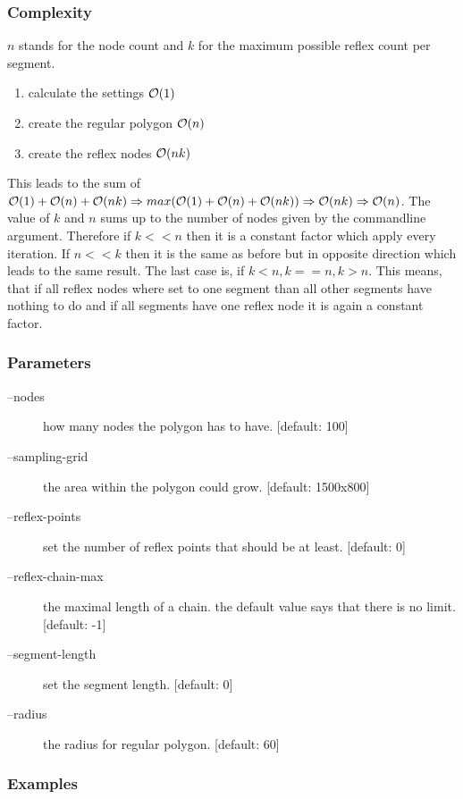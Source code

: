 \subsubsection{Complexity}
$n$ stands for the node count and $k$ for the maximum possible reflex count per segment.
\begin{enumerate}
  \item calculate the settings $\mathcal{O}(1)$
  \item create the regular polygon $\mathcal{O}(n)$
  \item create the reflex nodes $\mathcal{O}(nk)$
\end{enumerate}
This leads to the sum of $\mathcal{O}(1) + \mathcal{O}(n) + \mathcal{O}(nk) \Rightarrow
max(\mathcal{O}(1) + \mathcal{O}(n) + \mathcal{O}(nk)) \Rightarrow \mathcal{O}(nk) \Rightarrow
\mathcal{O}(n)$. The value of $k$ and $n$ sums up to the number of nodes given by the
commandline argument. Therefore if $k << n$ then it is a constant factor which
apply every iteration. If $n << k$ then it is the same as before but in opposite
direction which leads to the same result. The last case is, if $k < n, k == n, k
> n$. This means, that if all reflex nodes where set to one segment than all
other segments have nothing to do and if all segments have one reflex node it is
again a constant factor.

\subsubsection{Parameters}
\begin{description}
  \item [--nodes] how many nodes the polygon has to have. [default: 100]
  \item [--sampling-grid] the area within the polygon could grow. [default: 1500x800]
  \item [--reflex-points] set the number of reflex points that should be at least. [default: 0]
  \item [--reflex-chain-max] the maximal length of a chain. the default value says that there is no limit. [default: -1]
  \item [--segment-length] set the segment length. [default: 0]
  \item [--radius] the radius for regular polygon. [default: 60]
\end{description}


\subsubsection{Examples}

